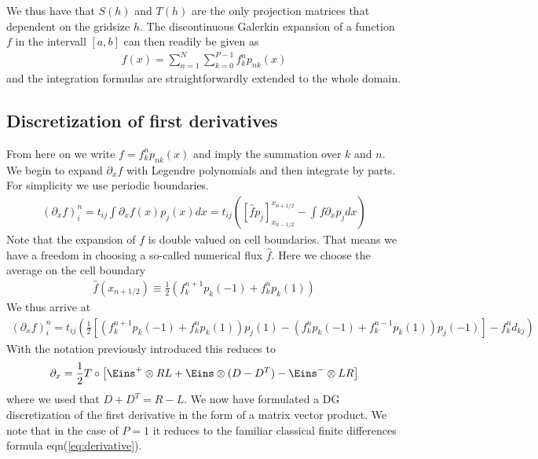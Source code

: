 \documentclass[a4paper,12pt]{scrartcl}
\begin{document}
We thus have that $S(h)$ and $T(h)$ are the only projection matrices that dependent on the gridsize $h$. The discontinuous Galerkin expansion of a function $f$ in the intervall $[a,b]$ can 
then readily be given as
\begin{align}
    f(x) = \sum_{n=1}^N \sum_{k=0}^{P-1} f^n_k p_{nk}(x)
\end{align}
and the integration formulas are straightforwardly extended to the whole domain.

















\subsection{ Discretization of first derivatives}
From here on we write
$ f = f^n_kp_{nk}(x)$ and imply the summation over $k$ and $n$.
We begin to expand $\partial_x f$
with Legendre polynomials and then integrate by parts. For 
simplicity we use periodic boundaries. 
\begin{align}
    (\partial_x f)^n_i = t_{ij}\int\partial_x f(x) p_j(x) dx = t_{ij}\left( [\hat f p_j]_{x_{n-1/2}}^{x_{n+1/2}} - \int f \partial_x p_j dx \right)
    \label{}
\end{align}
Note that the expansion of $f$ is double valued on cell boundaries. 
That means we have a freedom in choosing a so-called numerical flux $\hat f$.
Here we choose the average on the cell boundary
\begin{align}
    \hat f(x_{n+1/2}) \equiv \frac{1}{2}(f^{n+1}_kp_k(-1) + f^n_k p_k(1))
    \label{}
\end{align}
We thus arrive at
\begin{align}
    (\partial_x f)^n_i= t_{ij}\left(  \frac{1}{2}[(f^{n+1}_kp_k(-1)+ f^n_kp_k(1))p_j(1) 
                - (f^n_kp_k(-1) + f^{n-1}_kp_k(1))p_j(-1)] - f^n_k d_{kj} \right)
    \label{}
\end{align}
With the notation previously introduced this reduces to 
\begin{align}
    \partial_x = \frac{1}{2}T\circ \left[ \Eins^+\otimes RL + \Eins \otimes (D-D^T) - \Eins^-\otimes LR\right]
    \label{}
\end{align}
where we used that $D+D^T = R-L$. We now have formulated a DG discretization of the first derivative in the form of a matrix vector product. 
We note that in the case of $P = 1$ it reduces to the familiar classical finite
differences formula eqn(\ref{eq:derivative}).
\end{document}
